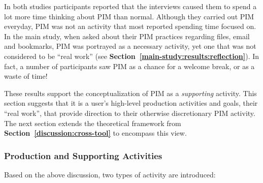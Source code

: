 In both studies participants reported that the interviews caused them to spend a lot more time thinking about PIM than normal.  Although they carried out PIM everyday, PIM was not an activity that most reported spending time focused on.  In the main study, when asked about their PIM practices regarding files, email and bookmarks, PIM was portrayed as a necessary activity, yet one that was not considered to be ``real work'' (see \textbf{Section~\ref{main-study:results:reflection}}).  In fact, a number of participants saw PIM as a chance for a welcome break, or as a waste of time! %

These results support the conceptualization of PIM as a \textit{supporting} activity.  This section suggests that it is a user's high-level production activities and goals, their ``real work'', that provide direction to their otherwise discretionary PIM activity.  The next section extends the theoretical framework from \textbf{Section~\ref{discussion:cross-tool}} to encompass this view.


\subsubsection{Production and Supporting Activities}
Based on the above discussion, two types of activity are introduced:

